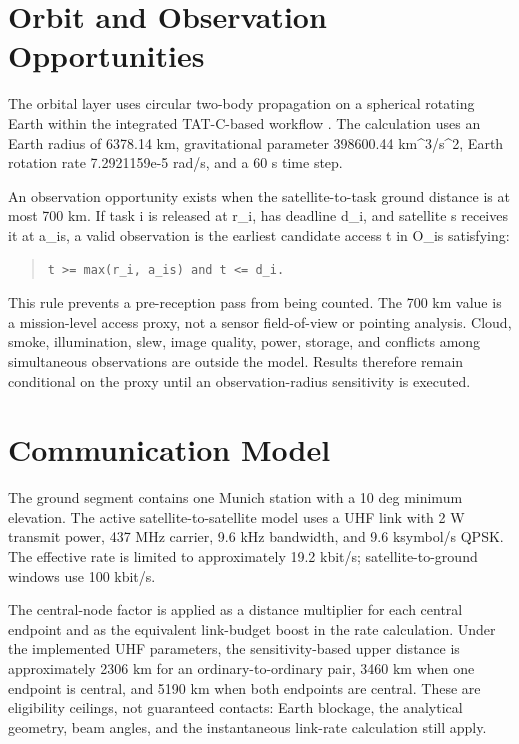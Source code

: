 \section{Orbit and Observation Opportunities}
The orbital layer uses circular two-body propagation on a spherical rotating Earth within the integrated TAT-C-based workflow \citep{TATC}. The calculation uses an Earth radius of 6378.14 km, gravitational parameter 398600.44 km\textasciicircum{}3/s\textasciicircum{}2, Earth rotation rate 7.2921159e-5 rad/s, and a 60 s time step.

An observation opportunity exists when the satellite-to-task ground distance is at most 700 km. If task i is released at r\_i, has deadline d\_i, and satellite s receives it at a\_is, a valid observation is the earliest candidate access t in O\_is satisfying:

\begin{quote}\texttt{t >= max(r\_i, a\_is) and t <= d\_i.}\end{quote}
This rule prevents a pre-reception pass from being counted. The 700 km value is a mission-level access proxy, not a sensor field-of-view or pointing analysis. Cloud, smoke, illumination, slew, image quality, power, storage, and conflicts among simultaneous observations are outside the model. Results therefore remain conditional on the proxy until an observation-radius sensitivity is executed.

\section{Communication Model}
The ground segment contains one Munich station with a 10 deg minimum elevation. The active satellite-to-satellite model uses a UHF link with 2 W transmit power, 437 MHz carrier, 9.6 kHz bandwidth, and 9.6 ksymbol/s QPSK. The effective rate is limited to approximately 19.2 kbit/s; satellite-to-ground windows use 100 kbit/s.

The central-node factor is applied as a distance multiplier for each central endpoint and as the equivalent link-budget boost in the rate calculation. Under the implemented UHF parameters, the sensitivity-based upper distance is approximately 2306 km for an ordinary-to-ordinary pair, 3460 km when one endpoint is central, and 5190 km when both endpoints are central. These are eligibility ceilings, not guaranteed contacts: Earth blockage, the analytical geometry, beam angles, and the instantaneous link-rate calculation still apply.

